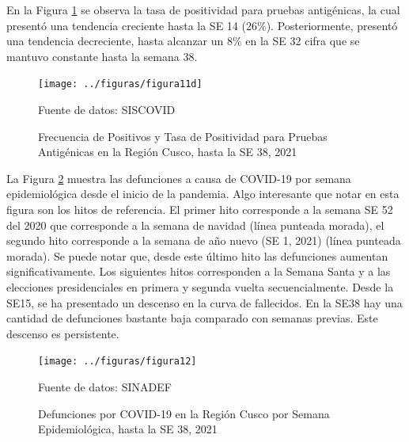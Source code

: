\documentclass[12pt,a4paper,openany]{book}
\begin{document}
	En la Figura \ref{fig:positivos_antigenicas} se observa la tasa de positividad para pruebas antigénicas, la cual presentó una tendencia creciente hasta la SE 14 (26$\%$). Posteriormente, presentó una tendencia decreciente, hasta alcanzar un 8$\%$ en la SE 32 cifra que se mantuvo constante hasta la semana 38.	
	\begin{figure}[h]
	\caption{Frecuencia de Positivos y Tasa de Positividad para Pruebas Antigénicas en la Región Cusco, hasta la SE 38, 2021}\label{fig:positivos_antigenicas}
	\begin{center}
		\texttt{[image: ../figuras/figura11d]}
	\end{center}
	{\footnotesize {Fuente de datos: SISCOVID}}
	\end{figure}
\clearpage
	La Figura \ref{fig:defunciones_semanal} muestra las defunciones a causa de COVID-19 por semana epidemiológica desde el inicio de la pandemia. Algo interesante que notar en esta figura son los hitos de referencia. El primer hito corresponde a la semana SE 52 del 2020 que corresponde a la semana de navidad (línea punteada morada), el segundo hito corresponde a la semana de año nuevo (SE 1, 2021) (línea punteada morada). Se puede notar que, desde este último hito las defunciones aumentan significativamente. Los siguientes hitos corresponden a la Semana Santa y a las elecciones presidenciales en primera y segunda vuelta secuencialmente. Desde la SE15, se ha presentado un descenso en la curva de fallecidos. En la SE38 hay una cantidad de defunciones bastante baja comparado con semanas previas. Este descenso es persistente.

	\begin{figure}[h]
	\caption{Defunciones por COVID-19 en la Región Cusco por Semana Epidemiológica, hasta la SE 38, 2021}\label{fig:defunciones_semanal}
	\begin{center}
		\texttt{[image: ../figuras/figura12]}
	\end{center}
	{\footnotesize {Fuente de datos: SINADEF}}
	\end{figure}
\end{document}

